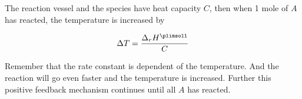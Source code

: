 The reaction vessel and the species have heat capacity $C$, then when 1 mole of $A$ has reacted, the temperature is increased by

\begin{equation}
    \Delta T = \frac{\Delta_r H^\plimsoll}{C}
\end{equation}

Remember that the rate constant is dependent of the temperature. And the reaction will go even faster and the temperature is increased. Further this positive feedback mechanism continues until all $A$ has reacted.